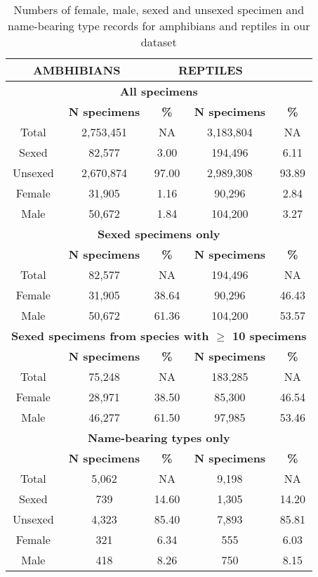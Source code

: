 
\begin{longtable}{ccccc}

\caption{Numbers of female, male, sexed and unsexed specimen and name-bearing type records for amphibians and reptiles in our dataset}\\ 
  
\hline
\multicolumn{2}{c}{\textbf{AMBHIBIANS}} & \multicolumn{2}{c}{\textbf{REPTILES}} \\
\hline
  \multicolumn{5}{c}{\textbf{All specimens}}\\  
  \hline
  & \textbf{N specimens} & \textbf{\%} & \textbf{N specimens} & \textbf{\%}\\
  \hline
  Total & 2,753,451 & NA & 3,183,804 & NA\\
  Sexed & 82,577 & 3.00 & 194,496 & 6.11\\
  Unsexed & 2,670,874 & 97.00 & 2,989,308 & 93.89\\
  Female & 31,905 & 1.16 & 90,296 & 2.84\\
  Male & 50,672 & 1.84 & 104,200 & 3.27\\
  \hline

  \multicolumn{5}{c}{\textbf{Sexed specimens only}}\\
  \hline
  & \textbf{N specimens} & \textbf{\%} & \textbf{N specimens} & \textbf{\%}\\
  \hline
  Total & 82,577 & NA & 194,496 & NA \\
  Female & 31,905 & 38.64 & 90,296 & 46.43\\
  Male & 50,672 & 61.36 & 104,200 & 53.57\\
  \hline

  \multicolumn{5}{c}{\textbf{Sexed specimens from species with $\geq$ 10 specimens}}\\
  \hline
  & \textbf{N specimens} & \textbf{\%} & \textbf{N specimens} & \textbf{\%}\\
  \hline
  Total & 75,248 & NA & 183,285 & NA\\
  Female & 28,971 & 38.50 & 85,300 & 46.54\\
  Male & 46,277 & 61.50 & 97,985 & 53.46\\
  \hline
 
  \multicolumn{5}{c}{\textbf{Name-bearing types only}}\\
  \hline
  & \textbf{N specimens} & \textbf{\%} & \textbf{N specimens} & \textbf{\%}\\
  \hline
  Total & 5,062 & NA & 9,198 & NA\\
  Sexed & 739 & 14.60 & 1,305 & 14.20\\
  Unsexed & 4,323  & 85.40 & 7,893 & 85.81\\
  Female & 321 & 6.34 & 555 & 6.03 \\
  Male & 418 & 8.26 & 750 & 8.15\\
  \hline
  

\end{longtable}
